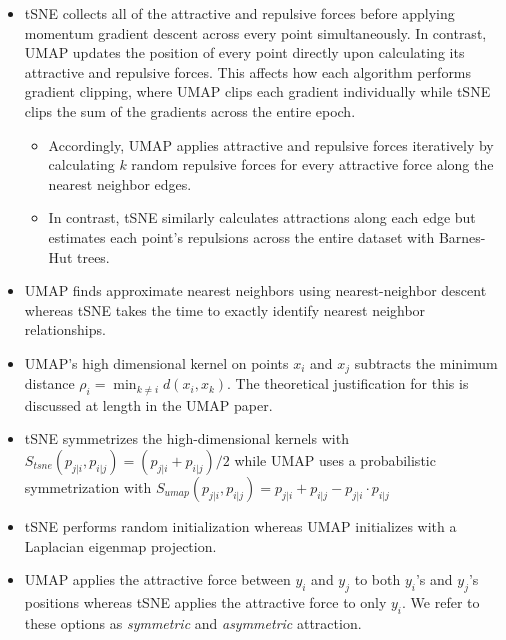 \documentclass{article}
\theoremstyle{definition}
\begin{document}
\begin{itemize}
    \item tSNE collects all of the attractive and repulsive forces before applying momentum gradient descent across every point simultaneously. In contrast,
        UMAP updates the position of every point directly upon calculating its attractive and repulsive forces. This affects how each algorithm performs gradient clipping, where UMAP clips each gradient individually while tSNE clips
        the sum of the gradients across the entire epoch.
    \begin{itemize}
        \item Accordingly, UMAP applies attractive and repulsive forces iteratively by calculating $k$ random repulsive forces for every attractive force along the
            nearest neighbor edges.
        \item In contrast, tSNE similarly calculates attractions along each edge but estimates each point's repulsions across the entire dataset with Barnes-Hut
            trees.
    \end{itemize}

    \item UMAP finds approximate nearest neighbors using nearest-neighbor descent whereas tSNE takes the time to exactly identify nearest neighbor relationships.

    \item UMAP's high dimensional kernel on points $x_i$ and $x_j$ subtracts the minimum distance $\rho_i = \min_{k \neq i} d(x_i, x_k)$. The theoretical
        justification for this is discussed at length in the UMAP paper. 

    \item tSNE symmetrizes the high-dimensional kernels with $S_{tsne}(p_{j|i}, p_{i|j}) = (p_{j|i} + p_{i|j}) / 2$ while UMAP uses a probabilistic
        symmetrization with $S_{umap}(p_{j|i}, p_{i|j}) = p_{j|i} + p_{i|j} - p_{j|i} \cdot p_{i|j}$

    \item tSNE performs random initialization whereas UMAP initializes with a Laplacian eigenmap projection.

    \item UMAP applies the attractive force between $y_i$ and $y_j$ to both $y_i$'s and $y_j$'s positions whereas tSNE applies the attractive force to only $y_i$.
        We refer to these options as \textit{symmetric} and \textit{asymmetric} attraction.
\end{itemize}
\end{document}
